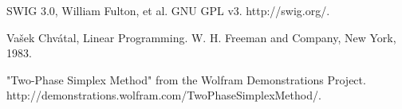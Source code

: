 \documentclass[11pt]{article}
\begin{document}
\begin{thebibliography}{9}
  SWIG 3.0,
  William Fulton, et al.  
  GNU GPL v3.
  http://swig.org/.
    
  Vašek Chvátal,
  Linear Programming.
  W. H. Freeman and Company, New York,
  1983.
  
  "Two-Phase Simplex Method" from the Wolfram Demonstrations Project.\\
  http://demonstrations.wolfram.com/TwoPhaseSimplexMethod/.

\end{thebibliography}  
       
\end{document}
